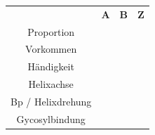 \begin{table}[H]
    \centering
    \begin{tabular}{cccc}
        & \textbf{A}& \textbf{B} & \textbf{Z} \\
        Proportion \\
        Vorkommen \\
        \gls{Händigkeit} \\
        Helixachse \\
        Bp / Helixdrehung \\
        Gycosylbindung \\
    \end{tabular} %
\end{table}




